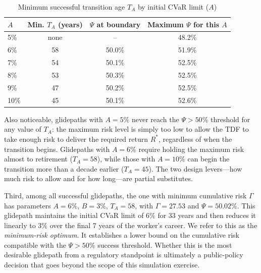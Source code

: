 \documentclass[11pt]{article}
\newcommand{\TA}{T_{A}}
\begin{document}
\begin{table}[H]
  \centering
  \caption{Minimum successful transition age $\TA$  by initial CVaR limit ($A$)  }
  \label{tab:boundary}
  \begin{tabular}{@{}lccc@{}}
    \toprule
    $A$ & Min.  $\TA$ (years) & $\Psi$ at boundary & Maximum $\Psi$ for this  $A$ \\
    \midrule
    5\% & none & -- & 48.2\% \\
    6\% & 58 & 50.0\% & 51.9\% \\
    7\% & 54 & 50.1\% & 52.5\% \\
    8\% & 53 & 50.3\% & 52.5\% \\
    9\% & 47 & 50.2\% & 52.5\% \\
    10\% & 45 & 50.1\% & 52.6\% \\
    \bottomrule
  \end{tabular}
\end{table}

Also noticeable, glidepaths with $A=5\%$ never reach the $\Psi > 50\%$  
threshold for any value of $T_A$: the maximum risk level is simply too low to 
allow the TDF to take enough risk to deliver the required return $R^*$, 
regardless of when the transition begins. Glidepaths with $A=6\%$ require 
holding the maximum risk almost to retirement ($T_A=58$), while those with 
$A=10\%$ can begin the transition more than a decade earlier ($T_A=45$). The 
two design levers---how much risk to allow and for how long---are partial 
substitutes.

Third, among all successful glidepaths, the one with minimum cumulative risk 
$\Gamma$ has parameters $A=6\%$, $B=3\%$, $T_A=58$, with $\Gamma=27.53$ and 
$\Psi=50.02\%$. This glidepath maintains the initial CVaR limit of $6\%$ for 
33 years and then reduces it linearly to $3\%$ over the final 7 years of the 
worker's career. We refer to this as the \emph{minimum-risk optimum}. It 
establishes a lower bound on the cumulative risk compatible with the 
$\Psi > 50\%$ success threshold. Whether this is the most desirable glidepath 
from a regulatory standpoint is ultimately a public-policy decision that goes 
beyond the scope of this simulation exercise.
\end{document}
